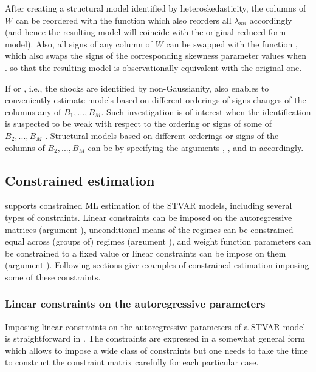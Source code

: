 \documentclass[nojss]{jss}
\begin{document}
After creating a structural model identified by heteroskedasticity, the columns of $W$ can be reordered with the function  which also reorders all $\lambda_{mi}$ accordingly (and hence the resulting model will coincide with the original reduced form model). Also, all signs of any column of $W$ can be swapped with the function , which also swaps the signs of the corresponding skewness parameter values when . so that the resulting model is observationally equivalent with the original one.

If  or , i.e., the shocks are identified by non-Gaussianity,  also enables to conveniently estimate models based on different orderings of signs changes of the columns any of $B_1,...,B_M$. Such investigation is of interest when the identification is suspected to be weak with respect to the ordering or signs of some of $B_2,...,B_M$ \citep[see Section~\ref{sec:ident_non_gauss}, and for further discussion]{Virolainen2:2024}. Structural models based on different orderings or signs of the columns of $B_2,...,B_M$ can be by specifying the arguments , , and  in  accordingly.

\subsection{Constrained estimation}\label{sec:examp_const}
 supports constrained ML estimation of the STVAR models, including several types of constraints. Linear constraints can be imposed on the autoregressive matrices (argument ), unconditional means of the regimes can be constrained equal across (groups of) regimes (argument ), and weight function parameters can be constrained to a fixed value or linear constraints can be impose on them (argument ). Following sections give examples of constrained estimation imposing some of these constraints.

\subsubsection{Linear constraints on the autoregressive parameters}

Imposing linear constraints on the autoregressive parameters of a STVAR model is straightforward in . The constraints are expressed in a somewhat general form which allows to impose a wide class of constraints but one needs to take the time to construct the constraint matrix carefully for each particular case.
\end{document}
